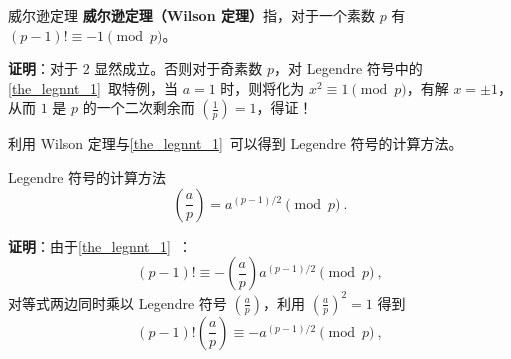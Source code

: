 
\begin{theorem}{威尔逊定理}
\textbf{威尔逊定理（Wilson 定理）}指，对于一个素数 $p$ 有 $(p-1)! \equiv -1 \pmod p$。
\end{theorem}
\textbf{证明}：对于 $2$ 显然成立。否则对于奇素数 $p$，对 Legendre 符号中的\autoref{the_legnnt_1}~取特例，当 $a=1$ 时，则将化为 $x^2 \equiv 1 \pmod p$，有解 $x = \pm 1$，从而 $1$ 是 $p$ 的一个二次剩余而 $\left(\frac 1p\right)=1$，得证！

利用 Wilson 定理与\autoref{the_legnnt_1}~可以得到 Legendre 符号的计算方法。
\begin{theorem}{Legendre 符号的计算方法}
\begin{equation}
\left(\frac ap\right) = a^{(p-1)/2} \pmod p ~.
\end{equation}
\end{theorem}
\textbf{证明}：由于\autoref{the_legnnt_1}~：
\begin{equation}
(p-1)! \equiv -\left(\frac ap\right) a^{(p-1)/2} \pmod p ~,
\end{equation}
对等式两边同时乘以 Legendre 符号 $\left(\frac ap\right)$，利用 $\left(\frac ap\right)^2 = 1$ 得到
\begin{equation}
(p-1)!\left(\frac ap\right) \equiv - a^{(p-1)/2} \pmod p ~,
\end{equation}
